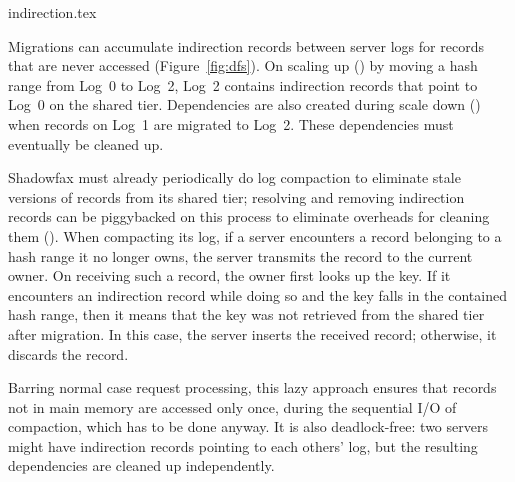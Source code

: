  {indirection.tex}

Migrations can accumulate indirection records between server logs
for records that are never accessed (Figure~\ref{fig:dfs}).
%
On scaling up (\one) by moving a hash range from
Log~0 to Log~2, Log~2 contains indirection records that point to
Log~0 on the shared tier.
%
Dependencies are also created during scale down (\two) when
records on Log~1 are migrated to Log~2.
%
These dependencies must eventually be cleaned up.

Shadowfax must already periodically do log compaction to eliminate stale
versions of records from its shared tier; resolving and removing indirection
records can be piggybacked on this process to eliminate overheads for
cleaning them (\three).
%
When compacting its log, if a server encounters a record belonging to a
hash range it no longer owns, the server transmits the record to the
current owner.
%
On receiving such a record, the owner first looks up the key.
%
If it encounters an indirection record while doing so and the key falls
in the contained hash range, then it means that the key was not retrieved
from the shared tier after migration.
%
In this case, the server inserts the received record; otherwise, it discards
the record.

Barring normal case request processing, this lazy approach
ensures that records not in main memory are accessed only once, during
the sequential I/O of compaction, which has to be done anyway.
%
It is also deadlock-free:
%
two servers might have indirection records pointing to each others' log,
but the resulting dependencies are cleaned up independently.
